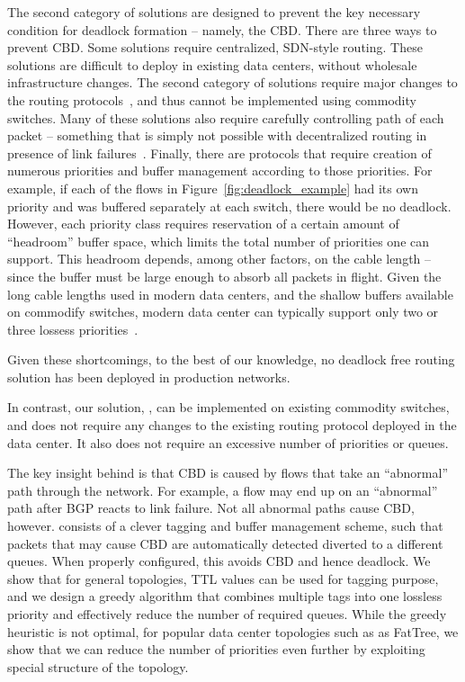 The second category of solutions are designed to prevent the key necessary
condition for deadlock formation -- namely, the CBD. There are three ways to
prevent CBD.  Some solutions require centralized, SDN-style routing.  These
solutions are difficult to deploy in existing data centers, without wholesale
infrastructure changes.  The second category of solutions require major changes
to the routing protocols~\cite{xxx}, and thus cannot be implemented using
commodity switches. Many of these solutions also require carefully controlling
path of each packet -- something that is simply not possible with decentralized
routing in presence of link failures~\cite{netpilot}.  Finally, there are
protocols that require creation of numerous priorities and buffer management
according to those priorities. For example, if each of the flows in
Figure~\ref{fig:deadlock_example} had its own priority and was buffered separately at each
switch, there would be no deadlock. However, each
priority class requires reservation of a certain amount of ``headroom'' buffer
space, which limits the total number of priorities one can support. This
headroom depends, among other factors, on the cable length -- since the buffer
must be large enough to absorb all packets in flight.  Given the long cable
lengths used in modern data centers, and the shallow buffers available on
commodify switches, modern data center can typically support only two or three
lossess priorities~\cite{rdmaatscale}.

Given these shortcomings, to the best of our knowledge, no deadlock free routing
solution has been deployed in production networks. 

In contrast, our solution, \sysname{}, can be implemented on existing commodity
switches, and does not require any changes to the existing routing protocol
deployed in the data center. It also does not require an excessive number of
priorities or queues.

The key insight behind \sysmame{} is that CBD is caused by flows that take an
``abnormal'' path through the network. For example, a flow may end up on an
``abnormal'' path after BGP reacts to link failure. Not all abnormal paths cause
CBD, however. \sysname{} consists of a clever tagging and buffer management
scheme, such that packets that may cause CBD are automatically detected diverted
to a different queues. When properly configured, this avoids CBD and hence
deadlock. We show that for general topologies, TTL values can be used for
tagging purpose, and we design a greedy algorithm that combines multiple tags
into one lossless priority and effectively reduce the number of required queues.
While the greedy heuristic is not optimal, for popular data center topologies
such as as FatTree, we show that we can reduce the number of priorities even
further by exploiting special structure of the topology.

